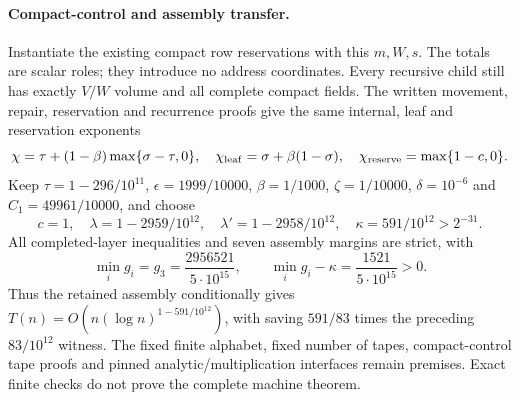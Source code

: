 \paragraph{Compact-control and assembly transfer.}
Instantiate the existing compact row reservations with this $m,W,s$.
The totals are scalar roles; they introduce no address coordinates.
Every recursive child still has exactly $V/W$ volume and all complete
compact fields. The written movement, repair, reservation and recurrence
proofs give the same internal, leaf and reservation exponents
\[
 \chi=\tau+(1-\beta)\max\{\sigma-\tau,0\},\quad
 \chi_{\rm leaf}=\sigma+\beta(1-\sigma),\quad
 \chi_{\rm reserve}=\max\{1-c,0\}.
\]
Keep $\tau=1-296/10^{11}$, $\epsilon=1999/10000$, $\beta=1/1000$,
$\zeta=1/10000$, $\delta=10^{-6}$ and $C_1=49961/10000$, and choose
\[
 c=1,\quad\lambda=1-2959/10^{12},\quad
 \lambda'=1-2958/10^{12},\quad\kappa=591/10^{12}>2^{-31}.
\]
All completed-layer inequalities and seven assembly margins are strict, with
\[
 \min_i g_i=g_3=\frac{2956521}{5\cdot10^{15}},\qquad
 \min_i g_i-\kappa=\frac{1521}{5\cdot10^{15}}>0.
\]
Thus the retained assembly conditionally gives
$T(n)=O(n(\log n)^{1-591/10^{12}})$, with saving $591/83$ times the preceding
$83/10^{12}$ witness. The fixed finite alphabet, fixed number of tapes,
compact-control tape proofs and pinned analytic/multiplication interfaces
remain premises. Exact finite checks do not prove the complete machine theorem.
